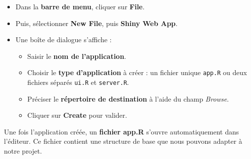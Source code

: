\documentclass[
]{article}
\providecommand{\tightlist}{%
  \setlength{\itemsep}{0pt}\setlength{\parskip}{0pt}}
\begin{document}
\begin{itemize}
\tightlist
\item
  Dans la \textbf{barre de menu}, cliquer sur \textbf{File}.\\
\item
  Puis, sélectionner \textbf{New File}, puis \textbf{Shiny Web App}.\\
\item
  Une boîte de dialogue s'affiche :

  \begin{itemize}
  \tightlist
  \item
    Saisir le \textbf{nom de l'application}.\\
  \item
    Choisir le \textbf{type d'application} à créer : un fichier unique
    \texttt{app.R} ou deux fichiers séparés \texttt{ui.R} et
    \texttt{server.R}.\\
  \item
    Préciser le \textbf{répertoire de destination} à l'aide du champ
    \emph{Browse}.\\
  \item
    Cliquer sur \textbf{Create} pour valider.
  \end{itemize}
\end{itemize}

Une fois l'application créée, un \textbf{fichier app.R} s'ouvre
automatiquement dans l'éditeur. Ce fichier contient une structure de
base que nous pouvons adapter à notre projet.
\end{document}
